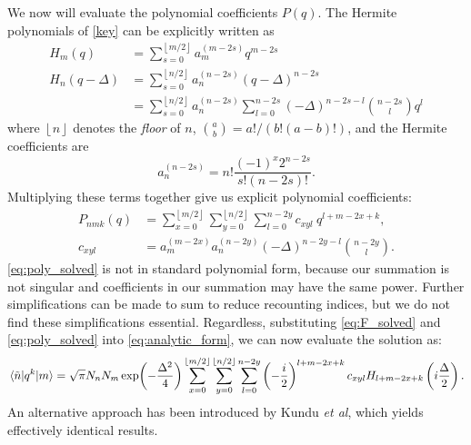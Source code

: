 \documentclass[aip, jcp, reprint, onecolumn, nofootinbib]{revtex4-2}
\begin{document}
We now will evaluate the polynomial coefficients $P(q)$.
The Hermite polynomials of \autoref{key} can be explicitly written as 
\begin{equation}
\begin{split}
	H_m(q) &= \sum_{s=0}^{\left\lfloor{m/2}\right\rfloor} a_m^{(m-2s)} q^{m-2s} \\
	H_n(q-\Delta) &= \sum_{s=0}^{\left\lfloor{n/2}\right\rfloor}
	a_n^{(n-2s)} (q-\Delta)^{n-2s} \\
		&= \sum_{s=0}^{\left\lfloor{n/2}\right\rfloor} a_n^{(n-2s)} \sum_{l=0}^{n-2s} \left(-\Delta\right)^{n-2s-l} \binom{n-2s}{l} q^l
\end{split}
\end{equation}
where $\left\lfloor n \right\rfloor$ denotes the \textit{floor} of $n$, $\binom{a}{b} = a! / (b!(a-b)!)$, and the Hermite coefficients are\cite{MorseFeshbach}
\begin{equation}
	a_n^{(n-2s)} = n! \frac{(-1)^x 2^{n-2s}}{s!(n-2s)!}.
\end{equation}
Multiplying these terms together give us explicit polynomial coefficients:
\begin{equation}\label{eq:poly_solved}
\begin{split}
	P_{nmk}(q) %
	&= \sum_{x=0}^{\left\lfloor{m/2}\right\rfloor} \sum_{y=0}^{\left\lfloor{n/2}\right\rfloor} \sum_{l=0}^{n-2y} c_{xyl} \ q^{l+m-2x+k}, \\
	c_{xyl} &= a_m^{(m-2x)} a_n^{(n-2y)} \left(-\Delta\right)^{n-2y-l} \binom{n-2y}{l}.
\end{split}
\end{equation}
\autoref{eq:poly_solved} is not in standard polynomial form, because our summation is not singular and coefficients in our summation may have the same power. 
Further simplifications can be made to sum to reduce recounting indices, but we do not find these simplifications essential.
Regardless, substituting \autoref{eq:F_solved} and \autoref{eq:poly_solved} into \autoref{eq:analytic_form}, we can now evaluate the solution as:
\begin{equation}\label{eq:general_solution}
	\mel{\tilde{n}}{q^k}{m} = \sqrt{\pi} N_n N_m 
	\exp(-\frac{\Delta^2}{4}) \sum_{x=0}^{\left\lfloor{m/2}\right\rfloor} \sum_{y=0}^{\left\lfloor{n/2}\right\rfloor} \sum_{l=0}^{n-2y} \left( -\frac{i}{2} \right)^{l+m-2x+k} c_{xyl} H_{l+m-2x+k}\left(i\frac{\Delta}{2}\right).
\end{equation}
An alternative approach has been introduced by Kundu \textit{et al}, which yields effectively identical results. \cite{Kundu2022}
\end{document}
